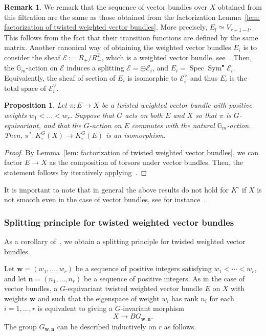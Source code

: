 \documentclass[12pt]{amsart}
\newcommand\spec{\operatorname{Spec}}
\newcommand\Gm{\mathbb{G}_m}
\newcommand{\sE}{\mathscr{E}}
\newcommand{\Sym}{\operatorname{Sym}}
\newcommand{\Kring}{K^{\circ}}
\newcommand{\Kgroup}{K_{\circ}}
\newtheorem{Prop}[theorem]{Proposition}
\theoremstyle{definition}
\newtheorem{Rmk}[theorem]{Remark}
\begin{document}
\begin{Rmk}
    We remark that the sequence of vector bundles over $X$ obtained from this filtration are the same as those obtained from the factorization Lemma~\ref{lem: factorization of twisted weighted vector bundles}. More precisely, $E_l\simeq V_{r+1-l}$. This follows from the fact that their transition functions are defined by the same matrix.
    Another canonical way of obtaining the weighted vector bundles $E_i$ is to consider the sheaf $\sE:=R_+/R_+^2$, which is a weighted vector bundle, see~\cite[Section 2.1.9]{quek-rydh-weighted-blowup}. Then, the $\Gm$-action on $\sE$ induces a splitting $\sE=\oplus\sE_i$, and $E_i=\spec\Sym^{\bullet}\sE_i$. Equivalently, the sheaf of section of $E_i$ is isomorphic to $\sE_i^{\vee}$ and thus $E_i$ is the total space of $\sE_i^{\vee}$.
\end{Rmk}

\begin{Prop}\label{prop: homotopy invariance twisted}
    Let $\pi:E\rightarrow X$ be a twisted weighted vector bundle with positive weights $w_1<\ldots<w_r$. Suppose that $G$ acts on both $E$ and $X$ so that $\pi$ is $G$-equivariant, and that the $G$-action on $E$ commutes with the natural $\Gm$-action. Then, $\pi^*:\Kgroup^G(X)\rightarrow\Kgroup^G(E)$ is an isomorphism.
\end{Prop}
\begin{proof}
    By Lemma~\ref{lem: factorization of twisted weighted vector bundles}, we can factor $E\rightarrow X$ as the composition of torsors under vector bundles. Then, the statement follows by iteratively applying~\cite[Theorem 4.1]{Thomason-equivariantKtheory}.
\end{proof}

It is important to note that in general the above results do not hold for $\Kring$ if $X$ is not smooth even in the case of vector bundles, see for instance~\cite[Example 2.1]{AndersonPayne-OperationalKtheory}.

\subsubsection{Splitting principle for twisted weighted vector bundles}

As a corollary of~, we obtain a splitting principle for twisted weighted vector bundles.

Let $\mathbf{w}=(w_1,\ldots,w_r)$ be a sequence of positive integers satisfying
$w_1<\cdots<w_r$, and let $\mathbf{n}=(n_1,\ldots,n_r)$ be a sequence of positive integers. As in the case of vector bundles, a $G$-equivariant twisted weighted vector bundle $E$ on $X$ with weights $\mathbf{w}$ and such that the eigenspace of weight $w_i$ has rank $n_i$ for each $i=1,\ldots,r$ is equivalent to giving a $G$-invariant morphism
$$
X\longrightarrow BG_{\mathbf{w},\mathbf{n}}.
$$
The group $G_{\mathbf{w},\mathbf{n}}$ can be described inductively on $r$ as follows.
\end{document}

